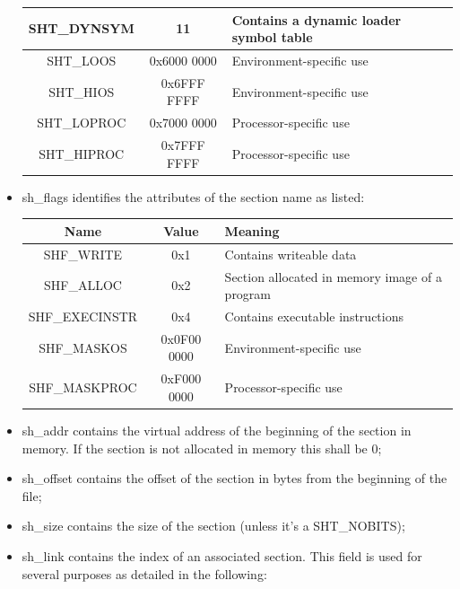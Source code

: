 \documentclass[paper=a4, fontsize=11pt]{report} %
\numberwithin{equation}{section} %
\numberwithin{figure}{section} %
\numberwithin{table}{section} %
\begin{document}
\begin{itemize}
\begin{center}
\begin{tabular}{|c|c|p{6cm}|}
			{\ttfamily SHT\_DYNSYM} & 11 & Contains a dynamic loader symbol 
			table\\ 
			\hline
			{\ttfamily SHT\_LOOS} & 0x6000 0000 & Environment-specific use\\ 
			\hline
			{\ttfamily SHT\_HIOS} & 0x6FFF FFFF & Environment-specific use \\ 
			\hline
			{\ttfamily SHT\_LOPROC} & 0x7000 0000 & Processor-specific use\\ 
			\hline
			{\ttfamily SHT\_HIPROC} & 0x7FFF FFFF & Processor-specific use\\ 
			\hline
		\end{tabular}
	\end{center}
  \item {\ttfamily sh\_flags} identifies the attributes of the section name
	as listed:
  \begin{center}
		\begin{tabular}{|c|c|p{6cm}|}
			\hline
			\textbf{Name} & \textbf{Value} & \textbf{Meaning} \\ \hline
			{\ttfamily SHF\_WRITE} & 0x1 & Contains writeable data\\ 
			\hline
			{\ttfamily SHF\_ALLOC} & 0x2 & Section allocated in memory image of 
			a program\\ 
			\hline
			{\ttfamily SHF\_EXECINSTR} & 0x4 & Contains executable 
			instructions\\ 
			\hline
			{\ttfamily SHF\_MASKOS} & 0x0F00 0000 & Environment-specific use\\ 
			\hline
			{\ttfamily SHF\_MASKPROC} & 0xF000 0000 & Processor-specific use\\ 
			\hline
		\end{tabular}
	\end{center}
  \item {\ttfamily sh\_addr} contains the virtual address of the beginning of 
	the section in memory. If the section is not allocated in memory this shall 
	be 0;
	\item {\ttfamily sh\_offset} contains the offset of the section in bytes 
	from the beginning of the file;
	\item {\ttfamily sh\_size} contains the size of the section (unless it's a 
	{\ttfamily SHT\_NOBITS});
	\item {\ttfamily sh\_link} contains the index of an associated section. 
	This field is used for several purposes as detailed in the following:
  \begin{center}
		\begin{tabular}{|c|c|}

\end{tabular}
\end{center}
\end{itemize}
\end{document}
